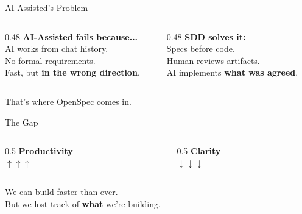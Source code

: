 \documentclass[aspectratio=169,18pt]{beamer}
\begin{document}
\begin{frame}{AI-Assisted's Problem}
  \vspace{0.3em}
  \begin{columns}[T]
    \begin{column}{0.48\textwidth}
      \textbf{\color{openred}AI-Assisted fails because...}\\[0.6em]
      \normalsize
      AI works from chat history.\\[0.4em]
      No formal requirements.\\[0.4em]
      Fast, but \textbf{in the wrong direction}.
    \end{column}
    \begin{column}{0.48\textwidth}
      \textbf{\color{opengreen}SDD solves it:}\\[0.6em]
      \normalsize
      Specs before code.\\[0.4em]
      Human reviews artifacts.\\[0.4em]
      AI implements \textbf{what was agreed}.
    \end{column}
  \end{columns}
  \vspace{1em}
  \small\color{opengray}That's where OpenSpec comes in.
\end{frame}

\begin{frame}{The Gap}
  \vspace{0.5em}
  \begin{columns}[T]
    \begin{column}{0.5\textwidth}
      \centering
      {\Large\textbf{Productivity}}\\[0.3em]
      {\fontsize{48}{56}\selectfont\color{opengreen}\textbf{$\uparrow\uparrow\uparrow$}}
    \end{column}
    \begin{column}{0.5\textwidth}
      \centering
      {\Large\textbf{Clarity}}\\[0.3em]
      {\fontsize{48}{56}\selectfont\color{openred}\textbf{$\downarrow\downarrow\downarrow$}}
    \end{column}
  \end{columns}
  \vspace{1.5em}
  \begin{center}
    We can build faster than ever.\\
    But we lost track of \textbf{what} we're building.
  \end{center}
\end{frame}
\end{document}
